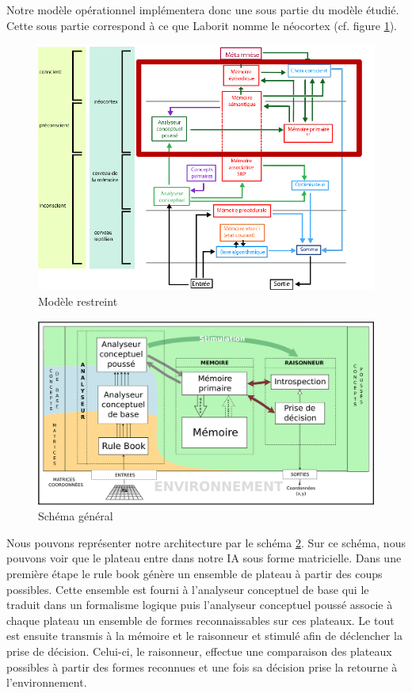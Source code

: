 
Notre modèle opérationnel implémentera donc une sous partie du modèle étudié. Cette sous partie correspond à ce que Laborit nomme le néocortex (cf. figure \ref{modele_restreint}).

\begin{figure}[H] 
\includegraphics[width=\textwidth]{files/modele_restreint} 
\caption{Modèle restreint} 
\label{modele_restreint}
\end{figure}

\begin{figure}[H] 
\includegraphics[width=\textwidth]{files/simplified_general_diagram} 
\caption{Schéma général} 
\label{schema_general}
\end{figure}

Nous pouvons représenter notre architecture par le schéma \ref{schema_general}. Sur ce schéma, nous pouvons voir que le plateau entre dans notre IA sous forme matricielle. Dans une première étape le \og rule book \fg{} génère un ensemble de plateau à partir des coups possibles. Cette ensemble est fourni à l'analyseur conceptuel de base qui le traduit dans un formalisme logique puis l'analyseur conceptuel poussé associe à chaque plateau un ensemble de formes reconnaissables sur ces plateaux. Le tout est ensuite transmis à la mémoire et le raisonneur et stimulé afin de déclencher la prise de décision. Celui-ci, le raisonneur, effectue une comparaison des plateaux possibles à partir des formes reconnues et une fois sa décision prise la retourne à l'environnement.
